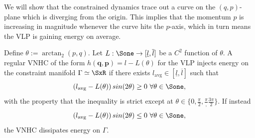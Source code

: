 We will show that the constrained dynamics trace out a curve on the
\((q,p)\)-plane which is diverging from the origin.  
This implies that the momentum \(p\) is increasing in magnitude whenever the
curve hits the \(p\)-axis, which in turn means the VLP is gaining energy on
average.

\begin{thm}\label{thm:vlp-energy-stabilization}
   Define \(\theta := \arctan_2(p,q)\).
   Let \(L : \Sone \rightarrow [\underline{l},\overline{l}]\) be a
   \(C^2\) function of \(\theta\).
   A regular VNHC of the form 
   \(h(\mathbf{q},\mathbf{p}) = l - L(\theta)\) for the VLP injects energy 
   on the constraint manifold \(\Gamma \simeq \SxR\) if there
   exists \(l_\text{avg} \in [\underline{l},\overline{l}]\) such that 
   \begin{equation}\label{eqn:vlp-energy-gain-condition}
      \left(l_\text{avg} - L(\theta)\right)sin(2\theta) \geq 0 
      \text{ }\forall \theta \in \Sone
      ,
   \end{equation}
   with the property that the inequality is strict except at 
   \(\theta \in \{0, \frac{\pi}{2}, \frac{\pi}, \frac{3\pi}{2}\}\).  
   If instead 
   \[
    \left(l_\text{avg} - L(\theta)\right)sin(2\theta) \leq 0 
         \text{ }\forall \theta \in \Sone
         ,
   \]
   the VNHC dissipates energy on \(\Gamma\).
\end{thm}

